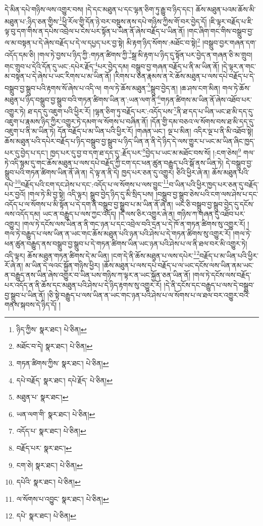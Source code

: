 དེ་མིན་དཔེ་གཉིས་ལས་འགྱུར་བས། །དེ་དང་མཐུན་པ་དང་ལྷན་ཅིག་ཏུ་རྒྱུ་བ་ཉིད་དང་། ཆོས་མཐུན་པའམ་ཆོས་མི་མཐུན་པ་:ཉིད་ཅན་གྱིས་\footnote{ཉིད་ཀྱིས་  སྣར་ཐང་།  པེ་ཅིན། }ཕྱི་རོལ་གྱི་དོན་ཉེ་བར་བསྡུས་ནས་དཔེ་གཉིས་ཀྱིས་གོ་བར་བྱེད་དོ། །ཇི་ལྟར་བརྗོད་པ་ཇི་ལྟ་བུ་དག་གིས་ན་དཔེས་འབྲེལ་པ་ངེས་པར་སྟོན་པ་ཡིན་ནོ་ཞེས་བརྗོད་པ་ཡིན་ནོ། །གང་ཞིག་གང་གིས་བསྒྲུབ་བྱ་ལ་མ་བསྟན་པ་དེ་ཞེས་བརྗོད་པ་དེ་ལ་དཔྱད་པར་བྱ་སྟེ། མི་རྟག་ཉིད་སོགས་:མཐོང་བ་སྟེ།\footnote{མཐོང་བ་དེ།  སྣར་ཐང་།  པེ་ཅིན། } །བསྒྲུབ་བྱར་གཞན་དག་འདོད་དམ་ཅི། །གལ་ཏེ་བྱས་པ་ཉིད་ཀྱི་:གཏན་ཚིགས་ཀྱི་\footnote{གཏན་ཚིགས་ཀྱིས་  སྣར་ཐང་།  པེ་ཅིན། }སྒྲ་མི་རྟག་པ་ཉིད་དུ་སྟོན་པར་བྱེད་ན་གཞན་ཅི་མ་གྲུབ། གང་གྲུབ་པ་དེའི་དོན་དུ་ཡང་:དཔེར་རྗོད་\footnote{དཔེ་བརྗོད་  སྣར་ཐང་། དཔེ་རྗོད་  པེ་ཅིན། }པར་བྱེད་དམ། བསྒྲུབ་བྱ་གཞན་བརྗོད་པ་ནི་མ་ཡིན་ནོ། །དེ་ལྟར་ན་གང་མ་བསྟན་པ་དེ་ཞེས་པ་ཡང་རིགས་པ་མ་ཡིན་ནོ། །རིགས་པ་ཅན་རྣམས་ན་རེ་ཆོས་མཐུན་པ་ལས་དཔེ་བརྗོད་པ་དེ་བསྒྲུབ་བྱ་སྒྲུབ་པའི་རྟགས་སོ་ཞེས་པ་འདི་ལ། གལ་ཏེ་ཆོས་མཐུན་\footnote{མཐུན་པ་  སྣར་ཐང་། }སྒྲུབ་བྱེད་ན། །ཆ་ཤས་ངག་མིན། གལ་ཏེ་ཆོས་མཐུན་པ་ཉིད་བསྒྲུབ་བྱ་སྒྲུབ་བའི་གཏན་ཚིགས་ཡིན་ན་:ཡན་ལག་ནི་\footnote{ཡན་ལག་གི་  སྣར་ཐང་།  པེ་ཅིན། }གཏན་ཚིགས་མ་ཡིན་ནོ་ཞེས་འཐོབ་པར་འགྱུར་ཏེ། ཐ་དད་དུ་འཇུག་པའི་ཕྱིར་རོ། །ལྷན་ཅིག་ཏུ་བརྗོད་པར་:འདོད་པས་\footnote{འདོད་པ་  སྣར་ཐང་།  པེ་ཅིན། }ནི་ཐ་དད་པ་ཡིན་ཡང་ཐ་མི་དད་དུ་འཇུག་པ་རྣམས་ཉིད་ཀྱིར་འགྱུར་ཏེ་དམག་ལ་སོགས་པ་བཞིན་ནོ། །དོན་གྱི་དམ་བཅའ་ལ་སོགས་བས་ཐ་མི་དད་དུ་འཇུག་པ་ནི་མ་ཡིན་ཏེ། དོན་བརྗོད་པ་མ་ཡིན་པའི་ཕྱིར་རོ། །གཞན་ཡང་། ལྔ་པ་མིན། འདིར་ལྔ་པ་ནི་མི་འཐོབ་སྟེ། ཆོས་མཐུན་པའི་དཔེར་བརྗོད་པ་ཉིད་བསྒྲུབ་བྱ་སྒྲུབ་པ་ཉིད་ཡིན་ན་ནི་དེ་ཉིད་དེ་ལས་གྱུར་པ་ཡང་མ་ཡིན་ཞིང་ཁྱད་པར་དུ་བྱེད་པ་དང་། ཁྱད་པར་དུ་བྱ་བ་དག་ཐ་དད་དུ་:རྗོད་པར་\footnote{བརྗོད་པར་  སྣར་ཐང་། }བྱེད་པ་ཡང་མ་མཐོང་བས་སོ། །:ངག་ཅེས།\footnote{ངག་ཅེ།  སྣར་ཐང་།  པེ་ཅིན། } གལ་ཏེ་འདི་སྙམ་དུ་གང་ཆོས་མཐུན་པ་ལས་དཔེ་བརྗོད་ཀྱི་ངག་དང་ཕན་ཚུན་བརྒྱུད་པའི་སྒོ་ནས་ཡིན་ཏེ། དེ་བསྒྲུབ་བྱ་སྒྲུབ་པའི་གཏན་ཚིགས་ཡིན་ནོ་ཞེ་ན། དེ་ལྟ་ན་ནི་དེ། ཁྱད་པར་ཅན་དུ་འགྱུར། ཅིའི་ཕྱིར་ཞེ་ན། ཆོས་མཐུན་པའི་དཔེ་\footnote{དཔེའི་  སྣར་ཐང་།  པེ་ཅིན། }བརྗོད་པའི་ངག་དང་ཤེས་པ་དང་:འདོད་པ་ལ་སོགས་པ་ལས་བྱུང་\footnote{ལ་སོགས་པ་འབྱུང་  སྣར་ཐང་།  པེ་ཅིན། }བ་ཡིན་པའི་ཕྱིར་ཁྱད་པར་ཅན་དུ་བརྗོད་པར་བྱའོ། །གལ་ཏེ་མི་བྱ་སྟེ། འདི་ལྟར། སྒྲུབ་བྱེད་ཉིད་དུ་མི་སྲིད་པས། །བསྒྲུབ་བྱ་སྒྲུབ་ཅེས་པའི་ངག་ལས་ཤེས་པ་དང་འདོད་པ་ལ་སོགས་པ་མི་སྟོན་པ་དེ་དག་ནི་བསྒྲུབ་བྱ་སྒྲུབ་པ་མ་ཡིན་ནོ་ཞེ་ན། ཡང་ཅི་བསྒྲུབ་བྱ་སྒྲུབ་བྱེད་དུ་དངོས་ལས་འདོད་དམ། ཡང་ན་བརྒྱུད་པ་ལས་ཀྱང་འདོད། །དེ་ལས་ཅིར་འགྱུར་ཞེ་ན། གཉིས་ཀ་གཞན་དུ་འཐོབ་པར་འགྱུར། །གལ་ཏེ་དངོས་ལས་ཡིན་ན་ནི་གང་ཉན་པ་དང་འབྲེལ་བའི་དྲན་པ་དེ་ཁོ་ན་གཏན་ཚིགས་སུ་འགྱུར་རོ། །གལ་ཏེ་བརྒྱུད་པ་ལས་ཡིན་ན་ཡང་གང་ཆོས་མཐུན་པའི་ཉན་པའི་ཤེས་པ་དེ་གཏན་ཚིགས་སུ་འགྱུར་རོ། །གལ་ཏེ་ཕན་ཚུན་བརྒྱུད་ནས་བསྒྲུབ་བྱ་སྒྲུབ་པ་དེ་གཏན་ཚིགས་ཡིན་ཡང་ཉན་པའི་ཤེས་པ་ལ་ནི་ཐལ་བར་མི་འགྱུར་ཏེ། འདི་ལྟར། ཆོས་མཐུན་གཏན་ཚིགས་དེ་མ་ཡིན། །ངག་དེ་ནི་ཆོས་མཐུན་པ་ལས་དཔེར་\footnote{དཔེ་  སྣར་ཐང་།  པེ་ཅིན། }བརྗོད་པ་མ་ཡིན་པའི་ཕྱིར་རོ་ཞེ་ན། མ་ཡིན་དེ་ལའང་སྐྱོན་གཉིས་ཕྱིར། །ཆོས་མཐུན་པ་ལས་དཔེ་བརྗོད་པ་ལ་ཡང་དངོས་ལས་ཡིན་ནམ་ཡང་ན་བརྒྱུད་ནས་ཡིན་ཞེས་འགྱུར་བ་ཡིན་པས་གཉིས་ཀ་ལྟར་ན་ཡང་སྐྱོན་ཅན་ཡིན་ནོ། །གལ་ཏེ་དངོས་ལས་བརྗོད་པར་འདོད་ན་ནི་ཆོས་དང་མཐུན་པའི་ཤེས་པ་དེ་ཉིད་རྟགས་སུ་འགྱུར་རོ། །དེ་ནི་དངོས་དང་བརྒྱུད་པ་ལས་དེ་བསྒྲུབ་བྱ་སྒྲུབ་པ་ཡིན་ནོ། །ཅི་སྟེ་བརྒྱུད་པ་ལས་ཡིན་ན་ཡང་གང་ཉན་པའི་ཤེས་པ་ལ་སོགས་པ་ལ་ཐལ་བར་འགྱུར་བའི་གནས་སྐབས་དེ་ཉིད་དོ། །
